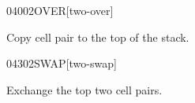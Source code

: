 \begin{worddef}{0400}{2OVER}[two-over]
\item {}

	Copy cell pair  to the top of the stack.

	\begin{testing} %
	\end{testing}
\end{worddef}


\begin{worddef}{0430}{2SWAP}[two-swap]
\item {}

	Exchange the top two cell pairs.

	\begin{testing} %
	\end{testing}
\end{worddef}


